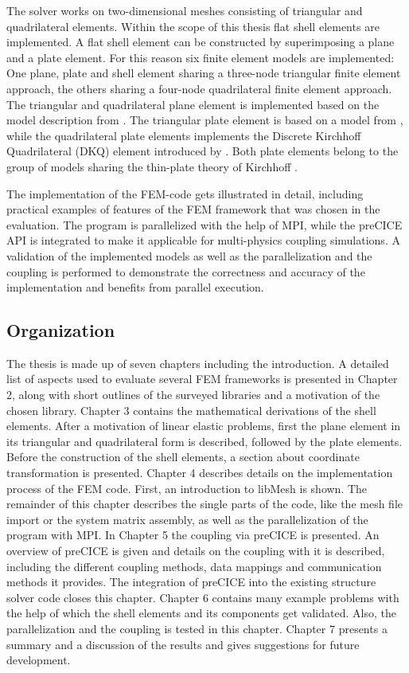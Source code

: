 The solver works on two-dimensional meshes consisting of triangular and quadrilateral elements. Within the scope of this thesis flat shell elements are implemented. A flat shell element can be constructed by superimposing a plane and a plate element. For this reason six finite element models are implemented: One plane, plate and shell element sharing a three-node triangular finite element approach, the others sharing a four-node quadrilateral finite element approach. The triangular and quadrilateral plane element is implemented based on the model description from \cite{steinke2005finite}. The triangular plate element is based on a model from \cite{specht1988modified}, while the quadrilateral plate elements implements the Discrete Kirchhoff Quadrilateral (DKQ) element introduced by \cite{zienkiewicz2000finite}. Both plate elements belong to the group of models sharing the thin-plate theory of Kirchhoff \cite{steinke2005finite}.

The implementation of the FEM-code gets illustrated in detail, including practical examples of features of the FEM framework that was chosen in the evaluation. The program is parallelized with the help of MPI, while the preCICE API is integrated to make it applicable for multi-physics coupling simulations. A validation of the implemented models as well as the parallelization and the coupling is performed to demonstrate the correctness and accuracy of the implementation and benefits from parallel execution.

\subsection{Organization}
The thesis is made up of seven chapters including the introduction. A detailed list of aspects used to evaluate several FEM frameworks is presented in Chapter 2, along with short outlines of the surveyed libraries and a motivation of the chosen library. Chapter 3 contains the mathematical derivations of the shell elements. After a motivation of linear elastic problems, first the plane element in its triangular and quadrilateral form is described, followed by the plate elements. Before the construction of the shell elements, a section about coordinate transformation is presented. Chapter 4 describes details on the implementation process of the FEM code. First, an introduction to libMesh is shown. The remainder of this chapter describes the single parts of the code, like the mesh file import or the system matrix assembly, as well as the parallelization of the program with MPI. In Chapter 5 the coupling via preCICE is presented. An overview of preCICE is given and details on the coupling with it is described, including the different coupling methods, data mappings and communication methods it provides. The integration of preCICE into the existing structure solver code closes this chapter. Chapter 6 contains many example problems with the help of which the shell elements and its components get validated. Also, the parallelization and the coupling is tested in this chapter. Chapter 7 presents a summary and a discussion of the results and gives suggestions for future development.

\newpage